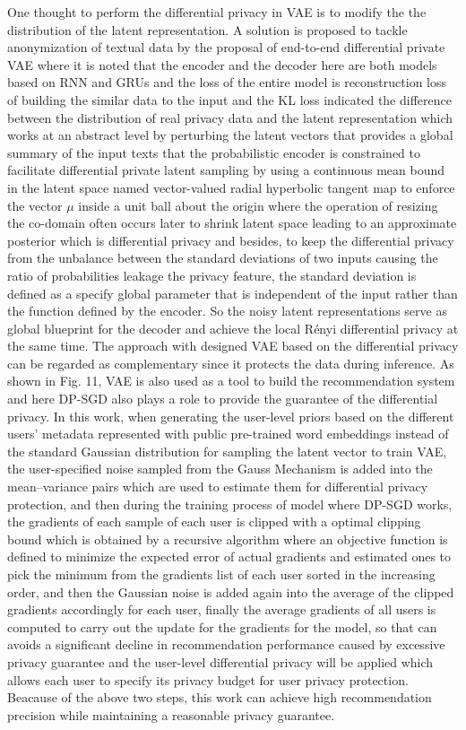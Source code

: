 \documentclass[conference]{IEEEtran}
\begin{document}
One thought to perform the differential privacy in VAE is to modify the the distribution of the latent representation. A solution\cite{b46} is proposed to tackle anonymization of textual data by the proposal of end-to-end differential private VAE where it is noted that the encoder and the decoder here are both models based on RNN and GRUs and the loss of the entire model is reconstruction loss of building the similar data to the input and the KL loss indicated the difference between the distribution of real privacy data and the latent representation which works at an abstract level by perturbing the latent vectors that provides a global summary of the input texts that the probabilistic encoder is constrained to facilitate differential private latent sampling by using a continuous mean bound in the latent space named vector-valued radial hyperbolic tangent map to enforce the vector $\mu$ inside a unit ball about the origin where the operation of resizing the co-domain often occurs later to shrink latent space leading to an approximate posterior which is differential privacy and besides, to keep the differential privacy from the unbalance between the standard deviations of two inputs causing the ratio of probabilities leakage the privacy feature, the standard deviation is defined as a specify global parameter that is independent of the input rather than the function defined by the encoder. So the noisy latent representations serve as global blueprint for the decoder and achieve the local Rényi differential privacy at the same time. The approach with designed VAE based on the differential privacy can be regarded as complementary since it protects the data during inference. As shown in Fig. 11, VAE is also used as a tool to build the recommendation system  and here DP-SGD also plays a role to provide the guarantee of the differential privacy\cite{b47}. In this work, when generating the user-level priors based on the different users' metadata represented with public pre-trained word embeddings instead of the standard Gaussian distribution for sampling the latent vector to train VAE, the user-specified noise sampled from the Gauss Mechanism is added into the mean–variance pairs which are used to estimate them for differential privacy protection, and then during the training process of model where DP-SGD works, the gradients of each sample of each user is clipped with a optimal clipping bound which is obtained by a recursive algorithm where an objective function is defined to minimize the expected error of actual gradients and estimated ones to pick the minimum from the gradients list of each user sorted in the increasing order, and then the Gaussian noise is added again into the average of the clipped gradients accordingly for each user, finally the average gradients of all users is computed to carry out the update for the gradients for the model, so that can avoids a significant decline in recommendation performance caused by excessive privacy guarantee and the user-level differential privacy will be applied which allows each user to specify its privacy budget for user privacy protection. Beacause of the above two steps, this work can achieve high recommendation precision while maintaining a reasonable privacy guarantee. 
\end{document}
